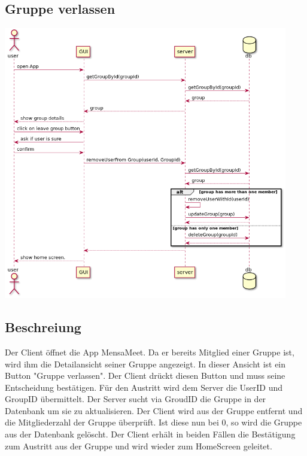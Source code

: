\documentclass[a4paper]{scrreprt}
\begin{document}
\subsection{Gruppe verlassen}
\begin{center}
	\includegraphics[width=0.93\textwidth]{Sequenzdiagramme/leaveGroupSD.png}
\end{center}

\subsection*{Beschreiung}
Der Client öffnet die App MensaMeet. Da er bereits Mitglied einer Gruppe ist, wird ihm die Detailansicht seiner Gruppe angezeigt.
In dieser Ansicht ist ein Button "Gruppe verlassen". Der Client drückt diesen Button und muss seine Entscheidung bestätigen. Für den Austritt wird dem Server die UserID und GroupID übermittelt. Der Server sucht via GroudID die Gruppe in der Datenbank um sie zu aktualisieren. Der Client wird aus der Gruppe entfernt und die Mitgliederzahl der Gruppe überprüft. Ist diese nun bei 0, so wird die Gruppe aus der Datenbank gelöscht.
Der Client erhält in beiden Fällen die Bestätigung zum Austritt aus der Gruppe und wird wieder zum HomeScreen geleitet.
\end{document}
